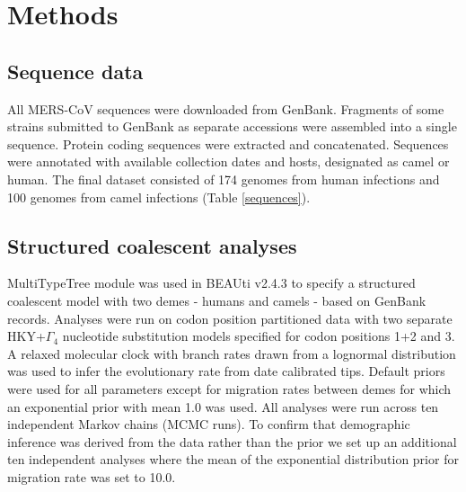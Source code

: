 \documentclass[11pt,oneside,letterpaper]{article}
\def\lmc#1{\textcolor{green}{[#1]}}
\begin{document}
\newpage

\section*{Methods}
\subsection*{Sequence data}
All MERS-CoV sequences were downloaded from GenBank.%
Fragments of some strains submitted to GenBank as separate accessions were assembled into a single sequence.
Protein coding sequences were extracted and concatenated.
Sequences were annotated with available collection dates and hosts, designated as camel or human.
The final dataset consisted of 174 genomes from human infections and 100 genomes from camel infections (Table \ref{sequences}).

\subsection*{Structured coalescent analyses}

MultiTypeTree module \citep{vaughan_efficient_2014} was used in BEAUti v2.4.3 \citep{bouckaert_beast_2014} to specify a structured coalescent model with two demes - humans and camels - based on GenBank records.
Analyses were run on codon position partitioned data with two separate HKY+$\Gamma_{4}$ \citep{hky_1985,yang_1994} nucleotide substitution models specified for codon positions 1+2 and 3.
A relaxed molecular clock with branch rates drawn from a lognormal distribution \citep{drummond_2006} was used to infer the evolutionary rate from date calibrated tips.
Default priors were used for all parameters except for migration rates between demes for which an exponential prior with mean 1.0 was used.
All analyses were run across ten independent Markov chains (MCMC runs).
To confirm that demographic inference was derived from the data rather than the prior we set up an additional ten independent analyses where the mean of the exponential distribution prior for migration rate was set to 10.0.
\end{document}
